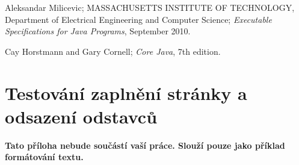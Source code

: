 \documentclass[11pt,twoside,a4paper]{book}
\begin{document}

\begin{thebibliography}{1}

Aleksandar Milicevic; MASSACHUSETTS INSTITUTE OF TECHNOLOGY, Department of
Electrical Engineering and Computer Science; \textit{Executable Specifications
for Java Programs}, September 2010.

Cay Horstmann and Gary Cornell; \textit{Core Java}, 7th edition.



\end{thebibliography}

%




%
{
\def\CS{$\cal C\kern-0.1667em\lower.5ex\hbox{$\cal S$}\kern-0.075em $}

}


%

\appendix

\chapter{Testování zaplnění stránky a odsazení odstavců}
\textbf{\large Tato příloha nebude součástí vaší práce. 
Slouží pouze jako příklad formátování textu.}
\end{document}

